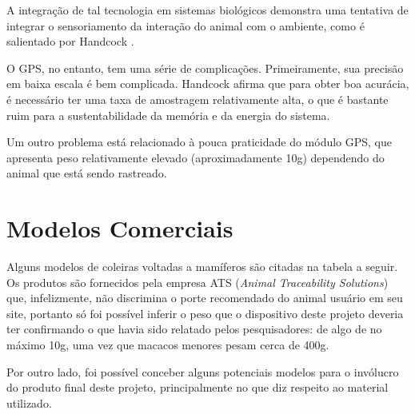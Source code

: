 A integração de tal tecnologia em sistemas biológicos demonstra uma tentativa de integrar o sensoriamento da interação do animal com o ambiente, como é salientado por Handcock \cite{handcock}.

O GPS, no entanto, tem uma série de complicações. Primeiramente, sua precisão em baixa escala é bem complicada. Handcock afirma que para obter boa acurácia, é necessário ter uma taxa de amostragem relativamente alta, o que é bastante ruim para a sustentabilidade da memória e da energia do sistema.

Um outro problema está relacionado à pouca praticidade do módulo GPS, que apresenta peso relativamente elevado (aproximadamente 10g) dependendo do animal que está sendo rastreado.

\section{Modelos Comerciais}
Alguns modelos de coleiras voltadas a mamíferos são citadas na tabela a seguir. Os produtos são fornecidos pela empresa ATS (\emph{Animal Traceability Solutions}) \cite{ats} que, infelizmente, não discrimina o porte recomendado do animal usuário em seu site, portanto só foi possível inferir o peso que o dispositivo deste projeto deveria ter confirmando o que havia sido relatado pelos pesquisadores: de algo de no máximo 10g, uma vez que macacos menores pesam cerca de 400g.

Por outro lado, foi possível conceber alguns potenciais modelos para o invólucro do produto final deste projeto, principalmente no que diz respeito ao material utilizado.

